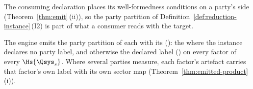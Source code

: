
The consuming declaration places its well-formedness conditions on a
party's side (Theorem~\ref{thm:emit}\,(ii)), so the party partition of
Definition~\ref{def:reduction-instance}\,(I2) is part of what a consumer
reads with the target.

\begin{requirement}\label{req:party-label}
The engine emits the party partition of each  with
its  (): the
 where the instance declares no party label,
and otherwise the declared label () on every factor of
every $\Hs{\Qsys_s}$. Where several parties measure, each factor's artefact
carries that factor's own label with its own sector map
(Theorem~\ref{thm:emitted-product}\,(i)).
\end{requirement}
